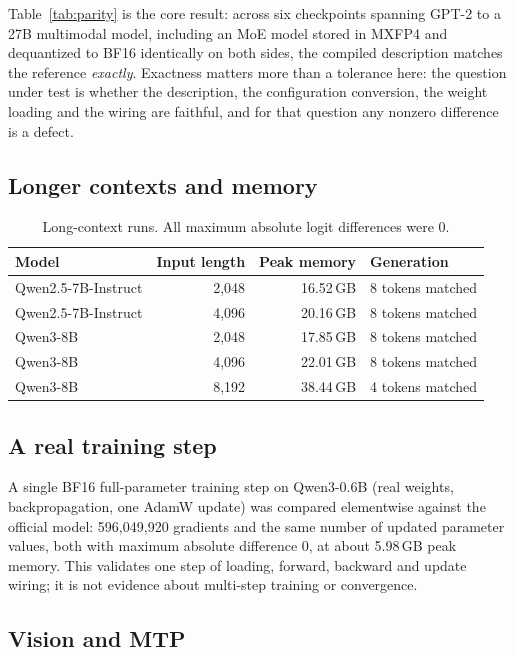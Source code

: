 \documentclass[11pt,a4paper]{article}
\begin{document}
Table~\ref{tab:parity} is the core result: across six checkpoints spanning
GPT-2 to a 27B multimodal model, including an MoE model stored in MXFP4 and
dequantized to BF16 identically on both sides, the compiled description
matches the reference \emph{exactly}. Exactness matters more than a tolerance
here: the question under test is whether the description, the configuration
conversion, the weight loading and the wiring are faithful, and for that
question any nonzero difference is a defect.

\subsection{Longer contexts and memory}

\begin{table}[t]
\centering
\caption{Long-context runs. All maximum absolute logit differences were 0.}
\label{tab:longctx}
\begin{tabular}{@{}lrrl@{}}
\toprule
Model & Input length & Peak memory & Generation \\
\midrule
Qwen2.5-7B-Instruct & 2{,}048 & 16.52\,GB & 8 tokens matched \\
Qwen2.5-7B-Instruct & 4{,}096 & 20.16\,GB & 8 tokens matched \\
Qwen3-8B & 2{,}048 & 17.85\,GB & 8 tokens matched \\
Qwen3-8B & 4{,}096 & 22.01\,GB & 8 tokens matched \\
Qwen3-8B & 8{,}192 & 38.44\,GB & 4 tokens matched \\
\bottomrule
\end{tabular}
\end{table}

\subsection{A real training step}

A single BF16 full-parameter training step on Qwen3-0.6B (real weights,
backpropagation, one AdamW update) was compared elementwise against the
official model: 596{,}049{,}920 gradients and the same number of updated
parameter values, both with maximum absolute difference 0, at about
5.98\,GB peak memory. This validates one step of loading, forward, backward
and update wiring; it is not evidence about multi-step training or
convergence.

\subsection{Vision and MTP}
\end{document}
